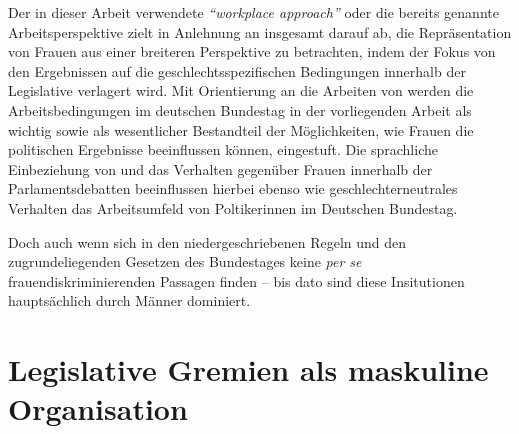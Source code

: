 \documentclass[12pt, 
    twoside=false, 
    bibliography=totoc, 
    numbers=endperiod, 
    headings=normal, 
    toc=chapterentrydotfill
    ]{scrbook}
\begin{document}
Der in dieser Arbeit verwendete \emph{\enquote{workplace approach}} oder die bereits genannte Arbeitsperspektive zielt in Anlehnung an \textcite{erikson_2018} insgesamt darauf ab, die Repräsentation von Frauen aus einer breiteren Perspektive zu betrachten, indem der Fokus von den Ergebnissen auf die geschlechtsspezifischen Bedingungen innerhalb der Legislative verlagert wird. Mit Orientierung an die Arbeiten von \textcites{dahlerup_2006}{dahlerup_1988}{erikson_2018} werden die  Arbeitsbedingungen im deutschen Bundestag in der vorliegenden Arbeit als wichtig sowie als wesentlicher Bestandteil der Möglichkeiten, wie Frauen die politischen Ergebnisse beeinflussen können, eingestuft. Die sprachliche Einbeziehung von und das Verhalten gegenüber Frauen innerhalb der Parlamentsdebatten beeinflussen hierbei ebenso wie geschlechterneutrales Verhalten das Arbeitsumfeld von Poltikerinnen im Deutschen Bundestag.

Doch auch wenn sich in den niedergeschriebenen Regeln und den zugrundeliegenden Gesetzen des Bundestages keine \emph{per se} frauendiskriminierenden Passagen finden -- bis dato sind diese Insitutionen hauptsächlich durch Männer dominiert.

\section{Legislative Gremien als maskuline Organisation}
\end{document}
